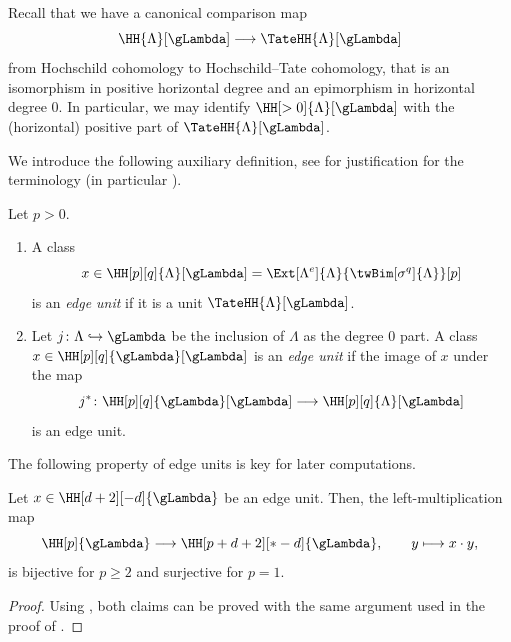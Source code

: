 \documentclass[a4paper]{amsart}
\begin{document}
Recall that we have a canonical comparison map
\[
  \HH{\Lambda}[\gLambda]\longrightarrow\TateHH{\Lambda}[\gLambda]
\]
from Hochschild cohomology to Hochschild--Tate cohomology, that is an
isomorphism in positive horizontal degree and an epimorphism in horizontal
degree $0$. In particular, we may identify $\HH[>0]{\Lambda}[\gLambda]$ with
the (horizontal) positive part of $\TateHH{\Lambda}[\gLambda]$.

We introduce the following auxiliary definition, see \cite[Sec.~6]{Mur22} for
justification for the terminology (in particular \cite[Prop.~6.5 and
Cor.~6.7]{Mur22}).

\begin{definition}
  Let $p>0$.
  \begin{enumerate}
  \item A class
    \[
      x\in\HH[p][q]{\Lambda}[\gLambda]=\Ext[\Lambda^e]{\Lambda}{\twBim[\sigma^q]{\Lambda}}[p]
    \]
    is an \emph{edge unit} if it is a unit $\TateHH{\Lambda}[\gLambda]$.
  \item Let $j\colon\Lambda\hookrightarrow\gLambda$ be the inclusion of
    $\Lambda$ as the degree $0$ part. A class
    $x\in\HH[p][q]{\gLambda}[\gLambda]$ is an \emph{edge unit} if the image of
    $x$ under the map
    \[
      j^*\colon\HH[p][q]{\gLambda}[\gLambda]\longrightarrow\HH[p][q]{\Lambda}[\gLambda]
    \]
    is an edge unit.
  \end{enumerate}
\end{definition}

The following property of edge units is key for later computations.

\begin{proposition}
  \label{prop:key_edege_units}
  Let $x\in\HH[d+2][-d]{\gLambda}$ be an edge unit. Then, the
  left-multiplication map
  \[
    \HH[p]{\gLambda}\longrightarrow\HH[p+d+2][*-d]{\gLambda},\qquad y\longmapsto
    x\cdot y,
  \]
  is bijective for $p\geq2$ and surjective for $p=1$.
\end{proposition}
\begin{proof}
  Using , both claims can be proved with the same
  argument used in the proof of \cite[Lemma~6.8]{Mur22}.
\end{proof}
\end{document}

